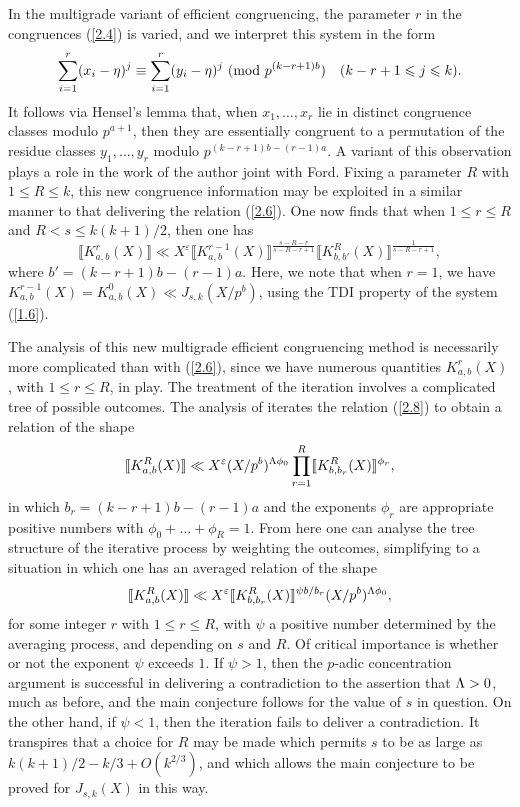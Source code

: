 \documentclass[12pt,reqno]{amsart}
\theoremstyle{definition}
\theoremstyle{remark}
\numberwithin{equation}{section}
\newcommand{\mmod}[1]{\,\,(\text{\rm mod}\,\,#1)}
\def\eps{\varepsilon}
\def\le{\leqslant} \def\ge{\geqslant} \def\pleq{\preccurlyeq} \def\ple{\prec}
\begin{document}
In the multigrade variant of efficient congruencing, the parameter $r$ in the congruences 
(\ref{2.4}) is varied, and we interpret this system in the form
\begin{equation}\label{2.7}
\sum_{i=1}^r(x_i-\eta)^j\equiv \sum_{i=1}^r(y_i-\eta)^j\mmod{p^{(k-r+1)b}}\quad 
(k-r+1\le j\le k).
\end{equation}
It follows via Hensel's lemma that, when $x_1,\ldots ,x_r$ lie in distinct congruence classes 
modulo $p^{a+1}$, then they are essentially congruent to a permutation of the residue 
classes $y_1,\ldots ,y_r$ modulo $p^{(k-r+1)b-(r-1)a}$. A variant of this observation plays 
a role in the work of the author \cite{FW2014} joint with Ford. Fixing a parameter $R$ with 
$1\le R\le k$, this new congruence information may be exploited in a similar manner to that 
delivering the relation (\ref{2.6}). One now finds that when $1\le r\le R$ and 
$R<s\le k(k+1)/2$, then one has
\begin{equation}\label{2.8}
\llbracket K_{a,b}^r(X)\rrbracket \ll X^\eps \llbracket K_{a,b}^{r-1}(X)
\rrbracket^{\tfrac{s-R-r}{s-R-r+1}}\llbracket K_{b,b'}^R(X)
\rrbracket^{\tfrac{1}{s-R-r+1}},
\end{equation}
where $b'=(k-r+1)b-(r-1)a$. Here, we note that when $r=1$, we have 
$K_{a,b}^{r-1}(X)=K_{a,b}^0(X)\ll J_{s,k}(X/p^b)$, using the TDI property of the system 
(\ref{1.6}).\par

The analysis of this new multigrade efficient congruencing method is necessarily more 
complicated than with (\ref{2.6}), since we have numerous quantities $K_{a,b}^r(X)$, with 
$1\le r\le R$, in play. The treatment of the iteration involves a complicated tree of possible 
outcomes. The analysis of \cite{Woo2015, Woo2016, Woo2017} iterates the relation 
(\ref{2.8}) to obtain a relation of the shape
$$\llbracket K_{a,b}^R(X)\rrbracket \ll X^\eps (X/p^b)^{\Lam \phi_0}\prod_{r=1}^R
\llbracket K_{b,b_r}^R(X)\rrbracket^{\phi_r},$$
in which $b_r=(k-r+1)b-(r-1)a$ and the exponents $\phi_r$ are appropriate positive 
numbers with $\phi_0+\ldots +\phi_R=1$. From here one can analyse the tree structure of 
the iterative process by weighting the outcomes, simplifying to a situation in which one has 
an averaged relation of the shape
$$\llbracket K_{a,b}^R(X)\rrbracket \ll X^\eps 
\llbracket K_{b,b_r}^R(X)\rrbracket^{\psi b/b_r}(X/p^b)^{\Lam \phi_0},$$
for some integer $r$ with $1\le r\le R$, with $\psi$ a positive number determined by the 
averaging process, and depending on $s$ and $R$. Of critical importance is whether or not 
the exponent $\psi$ exceeds $1$. If $\psi>1$, then the $p$-adic concentration argument is 
successful in delivering a contradiction to the assertion that ${\Lambda}>0$, much as before, and 
the main conjecture follows for the value of $s$ in question. On the other hand, if $\psi<1$, 
then the iteration fails to deliver a contradiction. It transpires that a choice for $R$ may be 
made which permits $s$ to be as large as $k(k+1)/2-k/3+O(k^{2/3})$, and which allows 
the main conjecture to be proved for $J_{s,k}(X)$ in this way.\par
\end{document}
